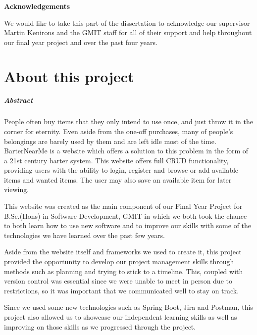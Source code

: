 \begin{titlepage}
   \begin{center}
       \vspace*{1cm}

       \textbf{Acknowledgements}
       \end{center}
       We would like to take this part of the dissertation to acknowledge our supervisor Martin Kenirons and the GMIT staff for all of their support and help throughout our final year project and over the past four years.
\end{titlepage}

\chapter*{About this project}
\paragraph{Abstract}
People often buy items that they only intend to use once, and just throw it in the corner for eternity. Even aside from the one-off purchases, many of people's belongings are barely used by them and are left idle most of the time. BarterNearMe is a website which offers a solution to this problem in the form of a 21st century barter system. This website offers full CRUD functionality, providing users with the ability to login, register and browse or add available items and wanted items. The user may also save an available item for later viewing. \par
This website was created as the main component of our Final Year Project for B.Sc.(Hons) in Software Development, GMIT in which we both took the chance to both learn how to use new software and to improve our skills with some of the technologies we have learned over the past few years. \par
Aside from the website itself and frameworks we used to create it, this project provided the opportunity to develop our project management skills through methods such as planning and trying to stick to a timeline. This, coupled with version control was essential since we were unable to meet in person due to restrictions, so it was important that we communicated well to stay on track. \par
Since we used some new technologies such as Spring Boot, Jira and Postman, this project also allowed us to showcase our independent learning skills as well as improving on those skills as we progressed through the project.

